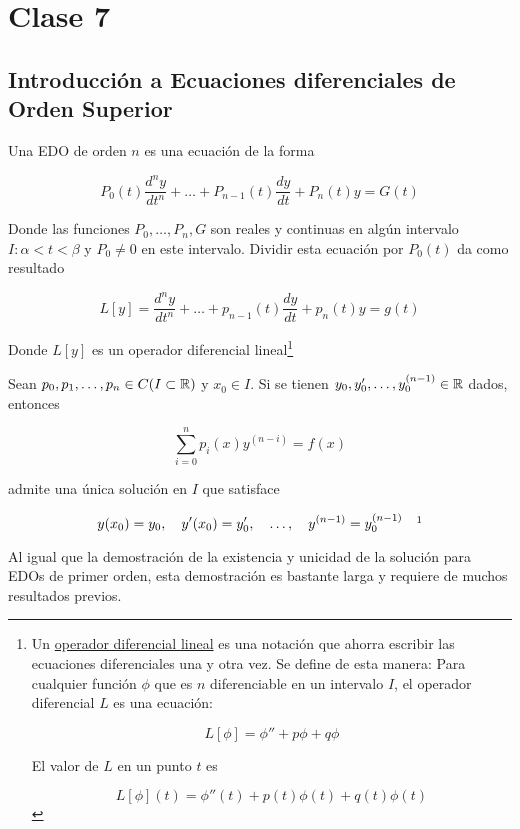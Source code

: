 \section{Clase 7}
\subsection{Introducción a Ecuaciones diferenciales de Orden Superior}

Una EDO de orden $n$ es una ecuación de la forma

\[
    P_0(t)\frac{d^ny}{dt^n} + \dots + P_{n-1}(t)\frac{dy}{dt} + P_n(t)y = G(t)
\]

Donde las funciones $P_0, \dots, P_n, G$  son reales y continuas en algún intervalo $I: \alpha < t < \beta$ y $P_0 \neq 0$ en este intervalo. Dividir esta ecuación por $P_0(t)$ da como resultado

\begin{equation}\label{eq:edon1}
    L[y] = \frac{d^ny}{dt^n} + \dots + p_{n-1}(t)\frac{dy}{dt} + p_n(t)y = g(t)
\end{equation}

Donde $L[y]$ es un operador diferencial lineal\footnote{Un \ul{operador diferencial lineal} es una notación que ahorra escribir las ecuaciones diferenciales una y otra vez. Se define de esta manera: Para cualquier función $\phi$ que es $n$ diferenciable en un intervalo $I$, el operador diferencial $L$ es una ecuación:

\[
    L[\phi] = \phi'' +  p\phi + q\phi
\]

El valor de $L$ en un punto $t$ es

\[
    L[\phi](t) = \phi''(t) +  p(t)\phi(t) + q(t)\phi(t)
\]}

\begin{teo}
    Sean $p_0, p_1, \dots, p_n \in C(I \subset \mathbb{R})$ y $x_0 \in I$. Si se tienen $y_0, y_0', \dots, y_0^{(n-1)} \in \mathbb{R}$ dados, entonces

    \[
        \sum_{i=0}^{n} p_i(x) y^{(n-i)} = f(x)
    \]

    \noindent admite una única solución en $I$ que satisface

    \[
        y(x_0) = y_0, \quad y'(x_0) = y_0', \quad \dots, \quad y^{(n-1)} = y_0^{(n-1)} \quad \footnotemark
    \]
\end{teo}

Al igual que la demostración de la existencia y unicidad de la solución para EDOs de primer orden, esta demostración es bastante larga y requiere de muchos resultados previos.

